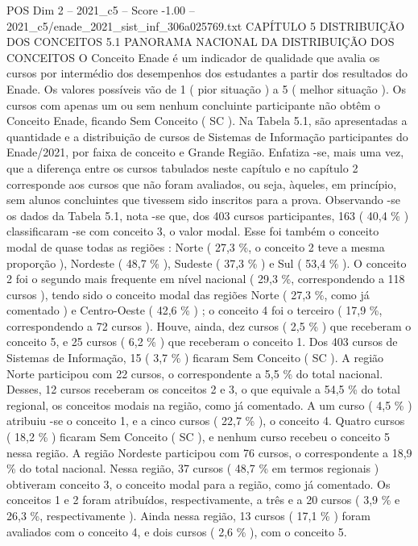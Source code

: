 \begin{textsample}{POS Dim 2 – 2021\_c5 – Score -1.00 – 2021\_c5/enade\_2021\_sist\_inf\_306a025769.txt}  \label{ex:f2_pos_287}
CAPÍTULO 5 DISTRIBUIÇÃO DOS CONCEITOS 5.1 PANORAMA NACIONAL DA DISTRIBUIÇÃO DOS CONCEITOS O Conceito Enade é um indicador de qualidade que avalia os cursos por intermédio dos desempenhos dos estudantes a partir dos resultados do Enade.
Os valores possíveis vão de 1 ( pior situação ) a 5 ( melhor situação ).
Os cursos com apenas um ou sem nenhum concluinte participante não obtêm o Conceito Enade, ficando Sem Conceito ( SC ).
Na Tabela 5.1, são apresentadas a quantidade e a distribuição de cursos de Sistemas de Informação participantes do Enade/2021, por faixa de conceito e Grande Região.
Enfatiza -se, mais uma vez, que a diferença entre os cursos tabulados neste capítulo e no capítulo 2 corresponde aos cursos que não foram avaliados, ou seja, àqueles, em princípio, sem alunos concluintes que tivessem sido inscritos para a prova.
Observando -se os dados da Tabela 5.1, nota -se que, dos 403 cursos participantes, 163 ( 40,4 \% ) classificaram -se com conceito 3, o valor modal.
Esse foi também o conceito modal de quase todas as regiões : Norte ( 27,3 \%, o conceito 2 teve a mesma proporção ), Nordeste ( 48,7 \% ), Sudeste ( 37,3 \% ) e Sul ( 53,4 \% ).
O conceito 2 foi o segundo mais frequente em nível nacional ( 29,3 \%, correspondendo a 118 cursos ), tendo sido o conceito modal das regiões Norte ( 27,3 \%, como já comentado ) e Centro-Oeste ( 42,6 \% ) ; o conceito 4 foi o terceiro ( 17,9 \%, correspondendo a 72 cursos ).
Houve, ainda, dez cursos ( 2,5 \% ) que receberam o conceito 5, e 25 cursos ( 6,2 \% ) que receberam o conceito 1.
Dos 403 cursos de Sistemas de Informação, 15 ( 3,7 \% ) ficaram Sem Conceito ( SC ).
A região Norte participou com 22 cursos, o correspondente a 5,5 \% do total nacional.
Desses, 12 cursos receberam os conceitos 2 e 3, o que equivale a 54,5 \% do total regional, os conceitos modais na região, como já comentado.
A um curso ( 4,5 \% ) atribuiu -se o conceito 1, e a cinco cursos ( 22,7 \% ), o conceito 4.
Quatro cursos ( 18,2 \% ) ficaram Sem Conceito ( SC ), e nenhum curso recebeu o conceito 5 nessa região.
A região Nordeste participou com 76 cursos, o correspondente a 18,9 \% do total nacional.
Nessa região, 37 cursos ( 48,7 \% em termos regionais ) obtiveram conceito 3, o conceito modal para a região, como já comentado.
Os conceitos 1 e 2 foram atribuídos, respectivamente, a três e a 20 cursos ( 3,9 \% e 26,3 \%, respectivamente ).
Ainda nessa região, 13 cursos ( 17,1 \% ) foram avaliados com o conceito 4, e dois cursos ( 2,6 \% ), com o conceito 5.

\end{textsample}
